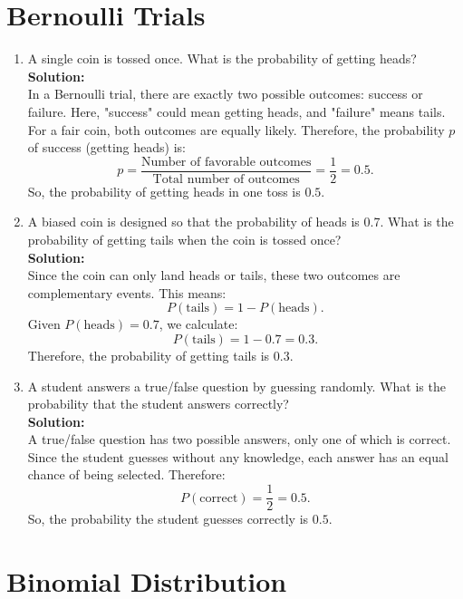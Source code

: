 \documentclass{book}
\begin{document}
\newpage


\section*{Bernoulli Trials}

\begin{enumerate}[label=Exercise \arabic*:]
    \item A single coin is tossed once. What is the probability of getting heads? \\
    \textbf{Solution:} \\
    In a Bernoulli trial, there are exactly two possible outcomes: success or failure. Here, "success" could mean getting heads, and "failure" means tails. For a fair coin, both outcomes are equally likely. Therefore, the probability \(p\) of success (getting heads) is:
    \[
    p = \frac{\text{Number of favorable outcomes}}{\text{Total number of outcomes}} = \frac{1}{2} = 0.5.
    \]
    So, the probability of getting heads in one toss is \(\boxed{0.5}\).

    \item A biased coin is designed so that the probability of heads is 0.7. What is the probability of getting tails when the coin is tossed once? \\
    \textbf{Solution:} \\
    Since the coin can only land heads or tails, these two outcomes are complementary events. This means:
    \[
    P(\text{tails}) = 1 - P(\text{heads}).
    \]
    Given \(P(\text{heads}) = 0.7\), we calculate:
    \[
    P(\text{tails}) = 1 - 0.7 = 0.3.
    \]
    Therefore, the probability of getting tails is \(\boxed{0.3}\).

    \item A student answers a true/false question by guessing randomly. What is the probability that the student answers correctly? \\
    \textbf{Solution:} \\
    A true/false question has two possible answers, only one of which is correct. Since the student guesses without any knowledge, each answer has an equal chance of being selected. Therefore:
    \[
    P(\text{correct}) = \frac{1}{2} = 0.5.
    \]
    So, the probability the student guesses correctly is \(\boxed{0.5}\).
\end{enumerate}

\section*{Binomial Distribution}
\end{document}
